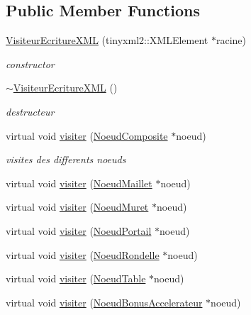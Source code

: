 \subsection*{Public Member Functions}
\begin{DoxyCompactItemize}
\item 
\hyperlink{group__inf2990_ga603ad88ebfda35e755544b4914b074ca}{Visiteur\+Ecriture\+X\+ML} (tinyxml2\+::\+X\+M\+L\+Element $\ast$racine)
\begin{DoxyCompactList}\small\item\em constructor \end{DoxyCompactList}\item 
\hyperlink{group__inf2990_gadf7aaa7cf24b9db027fae1d7311e88f4}{$\sim$\+Visiteur\+Ecriture\+X\+ML} ()
\begin{DoxyCompactList}\small\item\em destructeur \end{DoxyCompactList}\item 
virtual void \hyperlink{group__inf2990_ga7f22cab13593b84b8ce9a12f5a1ee20d}{visiter} (\hyperlink{class_noeud_composite}{Noeud\+Composite} $\ast$noeud)
\begin{DoxyCompactList}\small\item\em visites des differents noeuds \end{DoxyCompactList}\item 
virtual void \hyperlink{group__inf2990_ga03542b458767240b58f461c3d3b2a024}{visiter} (\hyperlink{class_noeud_maillet}{Noeud\+Maillet} $\ast$noeud)
\item 
virtual void \hyperlink{group__inf2990_gaea398607589ad92ffbf72fceebf3058c}{visiter} (\hyperlink{class_noeud_muret}{Noeud\+Muret} $\ast$noeud)
\item 
virtual void \hyperlink{group__inf2990_ga33c4411d6c8a5a4aa5de730e282d1b33}{visiter} (\hyperlink{class_noeud_portail}{Noeud\+Portail} $\ast$noeud)
\item 
virtual void \hyperlink{group__inf2990_ga56944b1a695729e789a8bdec7bec424f}{visiter} (\hyperlink{class_noeud_rondelle}{Noeud\+Rondelle} $\ast$noeud)
\item 
virtual void \hyperlink{group__inf2990_gaeb2a78298e8c18d34d1f9eee1920b419}{visiter} (\hyperlink{class_noeud_table}{Noeud\+Table} $\ast$noeud)
\item 
virtual void \hyperlink{group__inf2990_gaf4c4c56ab75e918739abbc00b274c938}{visiter} (\hyperlink{class_noeud_bonus_accelerateur}{Noeud\+Bonus\+Accelerateur} $\ast$noeud)
\end{DoxyCompactItemize}
